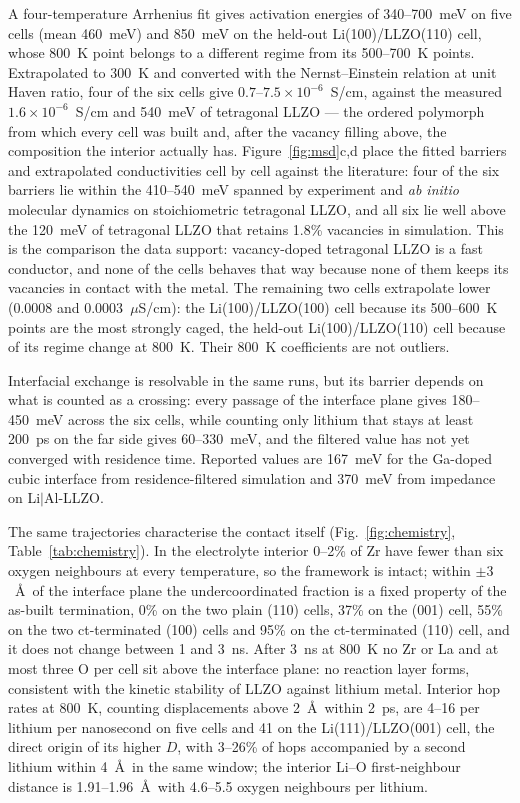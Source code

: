 \documentclass[11pt]{article}
\begin{document}
A four-temperature Arrhenius fit gives activation energies of 340--700~meV on
five cells (mean 460~meV) and 850~meV on the held-out Li(100)/LLZO(110) cell,
whose 800~K point belongs to a different regime from its 500--700~K points.
Extrapolated to 300~K and converted with the Nernst--Einstein relation at unit
Haven ratio, four of the six cells give $0.7$--$7.5\times10^{-6}$~S/cm, against
the measured $1.6\times10^{-6}$~S/cm and 540~meV of tetragonal
LLZO\citep{Awaka2009} --- the ordered polymorph from which every cell was built
and, after the vacancy filling above, the composition the interior actually
has. Figure~\ref{fig:msd}c,d place the fitted barriers and extrapolated
conductivities cell by cell against the literature: four of the six barriers
lie within the 410--540~meV spanned by experiment\citep{Awaka2009,Wolfenstine2012}
and \emph{ab initio} molecular dynamics\citep{Miara2013} on stoichiometric
tetragonal LLZO, and all six lie well above the 120~meV of tetragonal LLZO that
retains 1.8\% vacancies in simulation\citep{burov2026}. This is the comparison
the data support: vacancy-doped tetragonal LLZO is a fast conductor, and none
of the cells behaves that way because none of them keeps its vacancies in
contact with the metal. The remaining two cells extrapolate lower (0.0008 and
0.0003~$\mu$S/cm): the Li(100)/LLZO(100) cell because its 500--600~K points are
the most strongly caged, the held-out Li(100)/LLZO(110) cell because of its
regime change at 800~K. Their 800~K coefficients are not outliers.

Interfacial exchange is resolvable in the same runs, but its barrier depends on
what is counted as a crossing: every passage of the interface plane gives
180--450~meV across the six cells, while counting only lithium that stays at
least 200~ps on the far side gives 60--330~meV, and the filtered value has not
yet converged with residence time. Reported values are 167~meV for the Ga-doped
cubic interface from residence-filtered simulation\citep{burov2026} and 370~meV
from impedance on Li$|$Al-LLZO\citep{Krauskopf2019}.

The same trajectories characterise the contact itself
(Fig.~\ref{fig:chemistry}, Table~\ref{tab:chemistry}). In the electrolyte interior 0--2\% of Zr have fewer than six oxygen
neighbours at every temperature, so the framework is intact; within $\pm3$~\AA\
of the interface plane the undercoordinated fraction is a fixed property of the
as-built termination, 0\% on the two plain (110) cells, 37\% on the (001) cell,
55\% on the two ct-terminated (100) cells and 95\% on the ct-terminated (110)
cell, and it does not change between 1 and 3~ns. After 3~ns at 800~K no Zr or
La and at most three O per cell sit above the interface plane: no reaction layer
forms, consistent with the kinetic stability of LLZO against lithium
metal\citep{Iwasaki2022}. Interior hop rates at 800~K, counting displacements
above 2~\AA\ within 2~ps, are 4--16 per lithium per nanosecond on five cells
and 41 on the Li(111)/LLZO(001) cell, the direct origin of its higher $D$, with
3--26\% of hops accompanied by a second lithium within 4~\AA\ in the same
window; the interior Li--O first-neighbour distance is 1.91--1.96~\AA\ with
4.6--5.5 oxygen neighbours per lithium.
\end{document}
